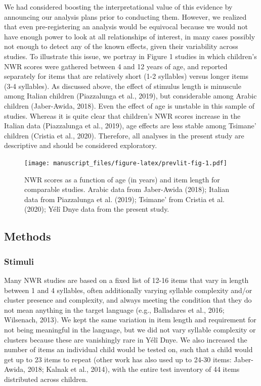 \documentclass[english,,man,floatsintext]{apa6}
\begin{document}
We had considered boosting the interpretational value of this evidence by announcing our analysis plans prior to conducting them. However, we realized that even pre-registering an analysis would be equivocal because we would not have enough power to look at all relationships of interest, in many cases possibly not enough to detect any of the known effects, given their variability across studies. To illustrate this issue, we portray in Figure 1 studies in which children's NWR scores were gathered between 4 and 12 years of age, and reported separately for items that are relatively short (1-2 syllables) versus longer items (3-4 syllables). As discussed above, the effect of stimulus length is minuscule among Italian children (Piazzalunga et al., 2019), but considerable among Arabic children (Jaber-Awida, 2018). Even the effect of age is unstable in this sample of studies. Whereas it is quite clear that children's NWR scores increase in the Italian data (Piazzalunga et al., 2019), age effects are less stable among Tsimane' children (Cristia et al., 2020). Therefore, all analyses in the present study are descriptive and should be considered exploratory.

\begin{figure}
\centering
\texttt{[image: manuscript\_files/figure-latex/prevlit-fig-1.pdf]}
\caption{\label{fig:prevlit-fig}NWR scores as a function of age (in years) and item length for comparable studies. Arabic data from Jaber-Awida (2018); Italian data from Piazzalunga et al. (2019); Tsimane' from Cristia et al. (2020); Yélî Dnye data from the present study.}
\end{figure}

\hypertarget{methods}{%
\subsection{Methods}\label{methods}}

\hypertarget{stimuli}{%
\subsubsection{Stimuli}\label{stimuli}}

Many NWR studies are based on a fixed list of 12-16 items that vary in length between 1 and 4 syllables, often additionally varying syllable complexity and/or cluster presence and complexity, and always meeting the condition that they do not mean anything in the target language (e.g., Balladares et al., 2016; Wilsenach, 2013). We kept the same variation in item length and requirement for not being meaningful in the language, but we did not vary syllable complexity or clusters because these are vanishingly rare in Yélî Dnye. We also increased the number of items an individual child would be tested on, such that a child would get up to 23 items to repeat (other work has also used up to 24-30 items: Jaber-Awida, 2018; Kalnak et al., 2014), with the entire test inventory of 44 items distributed across children.
\end{document}
